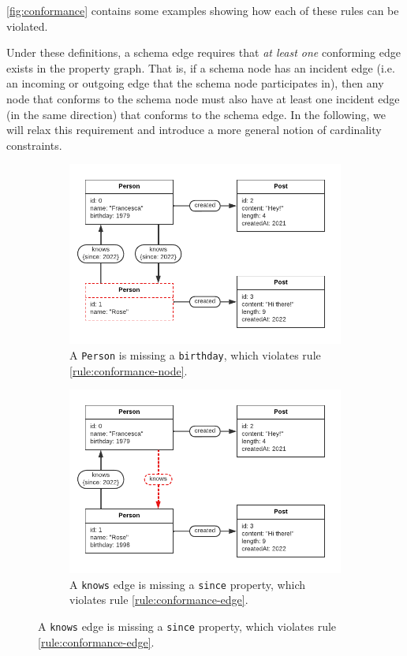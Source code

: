 \documentclass{article}
\begin{document}
\autoref{fig:conformance} contains some examples showing how each of these rules can be violated.

Under these definitions, a schema edge requires that \emph{at least one} conforming edge exists in the property graph. That is, if a schema node has an incident edge (i.e. an incoming or outgoing edge that the schema node participates in), then any node that conforms to the schema node must also have at least one incident edge (in the same direction) that conforms to the schema edge. In the following, we will relax this requirement and introduce a more general notion of cardinality constraints.

\begin{figure}[t]
  \centering
  \begin{subfigure}[t]{0.45\textwidth}
    \centering
    \includegraphics[width=\textwidth]{figures/conformance-node.pdf}
    \caption{A \texttt{Person} is missing a \texttt{birthday}, which violates rule \ref{rule:conformance-node}.}
    \label{fig:conformance-node}
  \end{subfigure}
  \hfill
  \begin{subfigure}[t]{0.45\textwidth}
    \centering
    \includegraphics[width=\textwidth]{figures/conformance-edge.pdf}
    \caption{A \texttt{knows} edge is missing a \texttt{since} property, which violates rule \ref{rule:conformance-edge}.}
    \label{fig:conformance-edge}
  \end{subfigure}


\end{figure}
\end{document}
